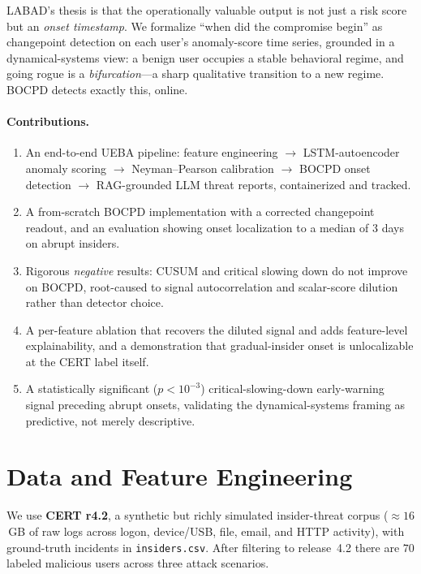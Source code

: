 \documentclass[11pt]{article}
\begin{document}
LABAD's thesis is that the operationally valuable output is not just a
risk score but an \emph{onset timestamp}. We formalize ``when did the
compromise begin'' as changepoint detection on each user's anomaly-score
time series, grounded in a dynamical-systems view: a benign user occupies
a stable behavioral regime, and going rogue is a \emph{bifurcation}---a
sharp qualitative transition to a new regime. BOCPD detects exactly this,
online.

\paragraph{Contributions.}
\begin{enumerate}[itemsep=2pt,topsep=2pt]
  \item An end-to-end UEBA pipeline: feature engineering $\rightarrow$
        LSTM-autoencoder anomaly scoring $\rightarrow$ Neyman--Pearson
        calibration $\rightarrow$ BOCPD onset detection $\rightarrow$
        RAG-grounded LLM threat reports, containerized and tracked.
  \item A from-scratch BOCPD implementation with a corrected changepoint
        readout, and an evaluation showing onset localization to a median
        of $3$ days on abrupt insiders.
  \item Rigorous \emph{negative} results: CUSUM and critical slowing down
        do not improve on BOCPD, root-caused to signal autocorrelation and
        scalar-score dilution rather than detector choice.
  \item A per-feature ablation that recovers the diluted signal and adds
        feature-level explainability, and a demonstration that gradual-insider
        onset is unlocalizable at the CERT label itself.
  \item A statistically significant ($p<10^{-3}$) critical-slowing-down
        early-warning signal preceding abrupt onsets, validating the
        dynamical-systems framing as predictive, not merely descriptive.
\end{enumerate}

\section{Data and Feature Engineering}

We use \textbf{CERT r4.2}, a synthetic but richly simulated insider-threat
corpus ($\approx 16$\,GB of raw logs across logon, device/USB, file,
email, and HTTP activity), with ground-truth incidents in
\texttt{insiders.csv}. After filtering to release~4.2 there are $70$
labeled malicious users across three attack scenarios.
\end{document}
